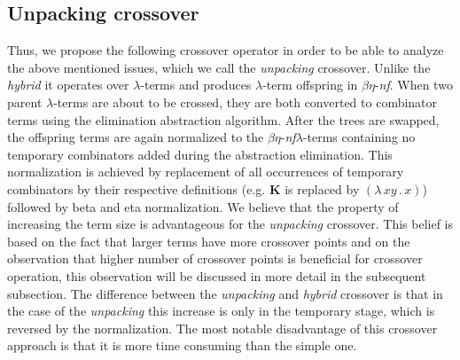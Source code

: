 \documentclass{sig-alternate}
\newcommand{\lterm}{$\lambda$-term\xspace}
\newcommand{\lterms}{$\lambda$-terms\xspace}
\newcommand{\lamb}[2]{( \lambda \, #1 \, . \, #2 )}
\newcommand{\Kcomb }{\mathbf{K}}
\newcommand{\benf}{$\beta\eta$-\textit{nf}\xspace}
\newcommand{\red}[1]{{\color{red} #1}}
\begin{document}
\subsection{Unpacking crossover}

Thus, we propose the following crossover operator in order to be able to analyze the above mentioned issues, which we call the \textit{unpacking} crossover. Unlike the \textit{hybrid} it operates over \lterms and produces \lterm offspring in \benf.
When two parent \lterms are about to be crossed, they are both
converted to combinator terms using the elimination abstraction algorithm. 
After the trees are swapped, the offspring terms are again 
normalized to the \benf \lterms containing no temporary  
combinators added during the abstraction elimination. 
This normalization is achieved by replacement of all 
occurrences of temporary combinators by their
respective definitions (e.g. $\Kcomb$ is replaced by $\lamb{x y}{x}$) 
followed by beta and eta normalization. 
We believe that the property of increasing the term size is 
advantageous for the \textit{unpacking} crossover.
This belief is based on the fact that larger terms have more crossover
points and on the observation that higher number of crossover points
is beneficial for crossover operation, this observation will be discussed
in more detail in the subsequent subsection. 
The difference between the \textit{unpacking} and \textit{hybrid}
crossover is that in the case of the \textit{unpacking}  
this increase is only in the temporary stage, which is reversed
by the normalization. 
The most notable disadvantage of this crossover approach is
that it is more time consuming than the simple one. 


\end{document}
